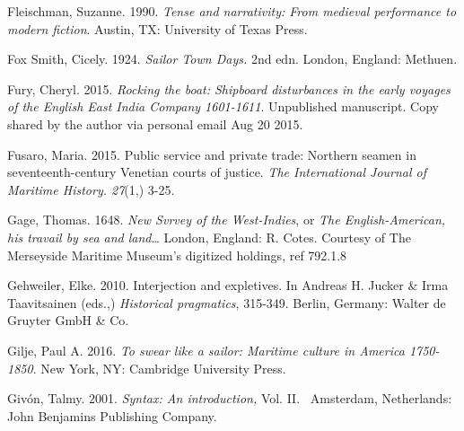 \begin{styleStandard}
Fleischman, Suzanne. 1990. \textit{Tense and narrativity: From medieval performance to modern fiction}. Austin, TX: University of Texas Press. 
\end{styleStandard}

\begin{styleStandard}
Fox Smith, Cicely. 1924. \textit{Sailor Town Days. }2nd edn.\textit{ }London, England: Methuen. 
\end{styleStandard}

\begin{styleStandard}
Fury, Cheryl. 2015. \textit{Rocking the boat: Shipboard disturbances in the early voyages of the English East India Company 1601-1611}. Unpublished manuscript. Copy shared by the author via personal email Aug 20 2015.
\end{styleStandard}

\begin{styleStandard}
Fusaro, Maria. 2015. Public service and private trade: Northern seamen in seventeenth-century Venetian courts of justice. \textit{The International Journal of Maritime History. 27}(1,) 3-25.
\end{styleStandard}

\begin{styleStandard}
Gage, Thomas. 1648. \textit{New Svrvey of the West-Indies}, or \textit{The English-American, his travail by sea and land}… London, England: R. Cotes. Courtesy of The Merseyside Maritime Museum’s digitized holdings, ref 792.1.8 
\end{styleStandard}

\begin{styleStandard}
Gehweiler, Elke. 2010. Interjection and expletives. In Andreas H. Jucker \& Irma Taavitsainen (eds.,) \textit{Historical pragmatics}, 315-349. Berlin, Germany: Walter de Gruyter GmbH \& Co.
\end{styleStandard}

\begin{styleStandard}
Gilje, Paul A. 2016. \textit{To swear like a sailor: Maritime culture in America 1750-1850}. New York, NY: Cambridge University Press.
\end{styleStandard}

\begin{styleStandard}
Givón, Talmy. 2001. \textit{Syntax: An introduction,} Vol. II. \ Amsterdam, Netherlands: John Benjamins Publishing Company.
\end{styleStandard}

